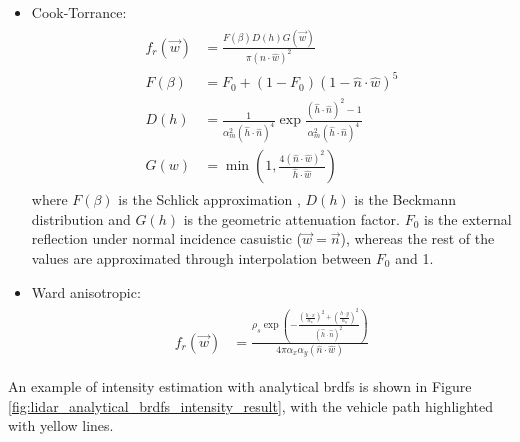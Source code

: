 \begin{itemize}
    \item Cook-Torrance: 
    \begin{gather}
        \label{eq:cook_torrance_brdf}
        \begin{aligned}
            f_{r}(\vec{w}) &= \frac{F(\beta)D(h)G(\vec{w})}{\pi (\hat{n} \cdot \hat{w})^{2}}\\
            F(\beta) &= F_{0} + (1 - F_{0}) (1 - \hat{n} \cdot \hat{w})^{5}\\
            D(h) &= \frac{1}{\alpha^{2}_{m} (\hat{h} \cdot \hat{n})^{4}} \exp{\frac{(\hat{h} \cdot \hat{n})^{2} - 1}{\alpha^{2}_{m}(\hat{h} \cdot \hat{n})^{4}}}\\
            G(w) &= \min\left(1, \frac{4(\hat{n} \cdot \hat{w})^{2}}{\hat{h} \cdot \hat{w} }\right)
        \end{aligned}
    \end{gather}
    where $F(\beta)$ is the Schlick approximation \cite{akenine-moller_real-time_2018}, $D(h)$ is the Beckmann distribution \cite{montes_soldado_overview_2012} and $G(h)$ is the geometric attenuation factor. $F_{0}$ is the external reflection under normal incidence casuistic ($\vec{w} = \vec{n}$), whereas the rest of the values are approximated through interpolation between $F_{0}$ and 1.
    \item Ward anisotropic: 
    \begin{gather}
        \label{eq:ward_brdf}
        \begin{aligned}
            f_{r}(\vec{w}) &= \frac{\rho_{s}\exp\left(-\frac{\left(\frac{h \cdot x}{\alpha_{x}}\right)^{2} + \left(\frac{h \cdot y}{\alpha_{y}}\right)^{2}}{(\hat{h} \cdot \hat{n})^{2}} \right)}{4\pi\alpha_{x}\alpha_{y} (\hat{n} \cdot \hat{w})}
        \end{aligned}
    \end{gather}
\end{itemize}

An example of intensity estimation with analytical \acrshort{brdf}s is shown in Figure \ref{fig:lidar_analytical_brdfs_intensity_result}, with the vehicle path highlighted with yellow lines. 

